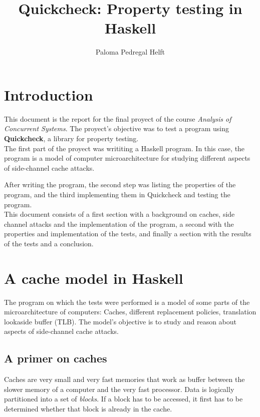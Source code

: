 \documentclass[11pt]{article}
\author{Paloma Pedregal Helft}
\date{}
\title{Quickcheck: Property testing in Haskell}
\begin{document}
\maketitle

\vspace{130px}

\tableofcontents

\clearpage

\section{Introduction}

This document is the report for the final proyect of the course \textit{Analysis of Concurrent Systems}.
The proyect's objective was to test a program using \textbf{Quickcheck}, a library for property testing.\\

The first part of the proyect was writiting a Haskell program. In this case, the program is a model of computer microarchitecture for studying different aspects of side-channel cache attacks.

After writing the program, the second step was listing the properties of the program, and the third implementing them in Quickcheck and testing the program.\\

This document consists of a first section with a background on caches, side channel attacks and the implementation of the program, a second with the properties and implementation of the tests, and finally a section with the results of the tests and a conclusion.

\clearpage

\section{A cache model in Haskell}

The program on which the tests were performed is a model of some parts of the microarchitecture of computers: Caches, different replacement policies, translation lookaside buffer (TLB). The model's objective is to study and reason about aspects of side-channel cache attacks.\\

\subsection{A primer on caches}

Caches are very small and very fast memories that work as buffer between the slower memory of a computer and the very fast processor. Data is logically partitioned into a set of \emph{blocks}. If a block has to be accessed, it first has to be determined whether that block is already in the cache.
\end{document}
